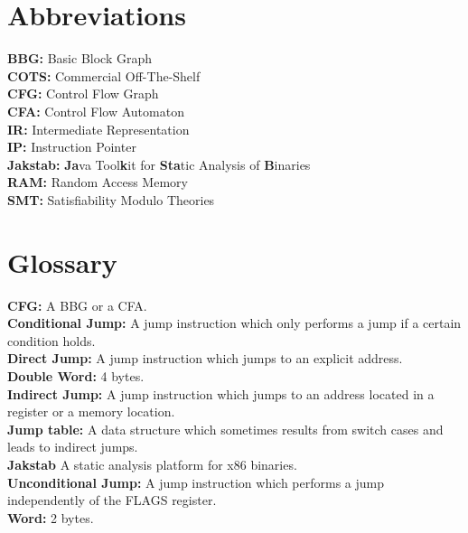 \documentclass{kththesis}
\begin{document}
\section*{Abbreviations}
\textbf{BBG:} Basic Block Graph\\
\textbf{COTS:} Commercial Off-The-Shelf\\
\textbf{CFG:} Control Flow Graph\\
\textbf{CFA:} Control Flow Automaton\\
\textbf{IR:} Intermediate Representation\\
\textbf{IP:} Instruction Pointer\\
\textbf{Jakstab:} \textbf{Ja}va Tool\textbf{k}it for \textbf{Sta}tic Analysis of \textbf{B}inaries\\
\textbf{RAM:} Random Access Memory\\
\textbf{SMT:} Satisfiability Modulo Theories\\

\clearpage
\thispagestyle{empty}
\section*{Glossary}
\textbf{CFG:} A BBG or a CFA.\\
\textbf{Conditional Jump:} A jump instruction which only performs a jump if a certain condition holds.\\
\textbf{Direct Jump:} A jump instruction which jumps to an explicit address.\\
\textbf{Double Word:} 4 bytes.\\
\textbf{Indirect Jump:} A jump instruction which jumps to an address located in a register or a memory location.\\
\textbf{Jump table:} A data structure which sometimes results from switch cases and leads to indirect jumps. \\
\textbf{Jakstab} A static analysis platform for x86 binaries. \\
\textbf{Unconditional Jump:} A jump instruction which performs a jump independently of the FLAGS register.\\
\textbf{Word:} 2 bytes.\\
\end{document}
